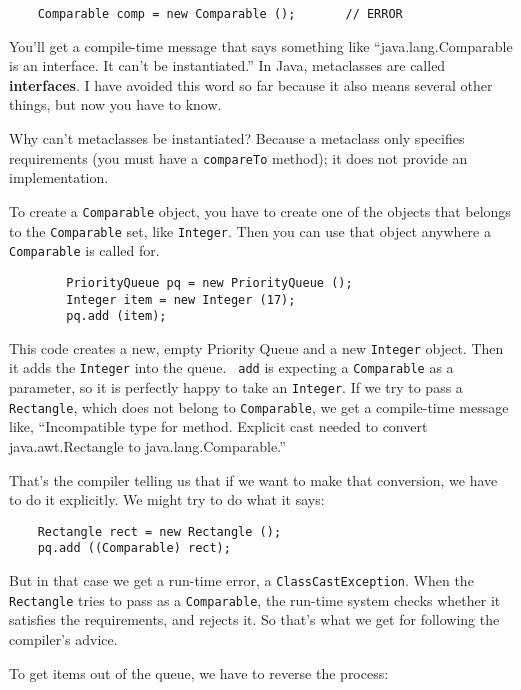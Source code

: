 \begin{verbatim}
    Comparable comp = new Comparable ();       // ERROR
\end{verbatim}
%
You'll get a compile-time message that says something like
``java.lang.Comparable is an interface.  It can't be instantiated.''
In Java, metaclasses are called {\bf interfaces}.  I have
avoided this word so far because it also means several other
things, but now you have to know.


Why can't metaclasses be instantiated?  Because a metaclass
only specifies requirements (you must have a {\tt compareTo}
method); it does not provide an implementation.

To create a {\tt Comparable} object, you have to create one of the
objects that belongs to the {\tt Comparable} set, like {\tt Integer}.
Then you can use that object anywhere a {\tt Comparable} is called
for.

\begin{verbatim}
        PriorityQueue pq = new PriorityQueue ();
        Integer item = new Integer (17);
        pq.add (item);
\end{verbatim}
%
This code creates a new, empty Priority Queue and a new {\tt Integer}
object.  Then it adds the {\tt Integer} into the queue.  {\tt
add} is expecting a {\tt Comparable} as a parameter, so it is
perfectly happy to take an {\tt Integer}.  If we try to pass a {\tt
Rectangle}, which does not belong to {\tt Comparable}, we get a
compile-time message like, ``Incompatible type for method.  Explicit
cast needed to convert java.awt.Rectangle to java.lang.Comparable.''

That's the compiler telling us that if we want to make that conversion,
we have to do it explicitly.  We might try to do what it says:

\begin{verbatim}
	Rectangle rect = new Rectangle ();
	pq.add ((Comparable) rect);
\end{verbatim}
%
But in that case we get a run-time error, a {\tt ClassCastException}.
When the {\tt Rectangle} tries to pass as a {\tt Comparable}, the
run-time system checks whether it satisfies the requirements, and
rejects it.  So that's what we get for following the compiler's advice.


To get items out of the queue, we have to reverse the process:

